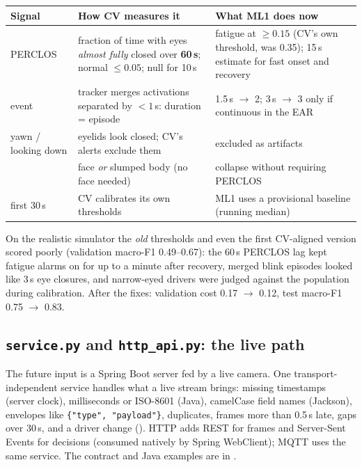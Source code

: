\documentclass[11pt,a4paper]{article}
\newcommand{\code}[1]{\texttt{\detokenize{#1}}}
\newcommand{\fname}[1]{\texttt{\textcolor{s1}{\detokenize{#1}}}}
\newcommand{\thead}[1]{\sffamily\bfseries\small #1}
\begin{document}
\begin{tabularx}{\textwidth}{@{}>{\raggedright\arraybackslash}p{3.3cm} Y Y@{}}
\toprule
\thead{Signal} & \thead{How CV measures it} & \thead{What ML1 does now} \\
\midrule
PERCLOS & fraction of time with eyes \emph{almost fully} closed over \textbf{60\,s}; normal $\le0.05$; null for 10\,s & fatigue at $\ge 0.15$ (CV's own threshold, was 0.35); 15\,s estimate for fast onset and recovery \\
\code{eyes_closed} event & tracker merges activations separated by $<1$\,s: duration = episode & 1.5\,s $\to$ 2; 3\,s $\to$ 3 only if continuous in the EAR \\
yawn / looking down & eyelids look closed; CV's alerts exclude them & excluded as artifacts \\
\code{head_drop} & face \emph{or} slumped body (no face needed) & collapse without requiring PERCLOS \\
first 30\,s & CV calibrates its own thresholds & ML1 uses a provisional baseline (running median) \\
\bottomrule
\end{tabularx}

\begin{pitfall}
On the realistic simulator the \emph{old} thresholds and even the first CV-aligned version scored poorly
(validation macro-F1 0.49--0.67): the 60\,s PERCLOS lag kept fatigue alarms on for up to a minute after recovery,
merged blink episodes looked like 3\,s eye closures, and narrow-eyed drivers were judged against the population
during calibration. After the fixes: validation cost 0.17 $\to$ 0.12, test macro-F1 0.75 $\to$ 0.83.
\end{pitfall}

\subsection{\texttt{service.py} and \texttt{http\_api.py}: the live path}
The future input is a Spring Boot server fed by a live camera. One transport-independent service handles what
a live stream brings: missing timestamps (server clock), milliseconds or ISO-8601 (Java), camelCase field names
(Jackson), envelopes like \texttt{\{"type", "payload"\}}, duplicates, frames more than 0.5\,s late, gaps over 30\,s,
and a driver change (\code{/reset}). HTTP adds REST for frames and Server-Sent Events for decisions (consumed
natively by Spring WebClient); MQTT uses the same service. The contract and Java examples are in
\fname{docs/API.md}.
\end{document}
